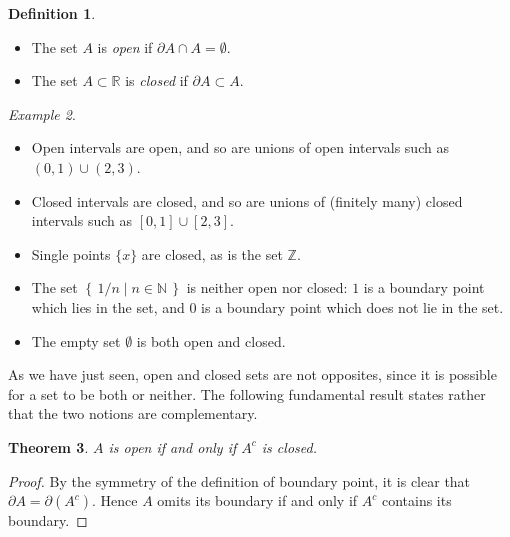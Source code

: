 \documentclass[11pt,oneside]{amsbook}
\newcommand{\set}[1]{\left\{\,#1\,\right\}}
\newcommand{\N}{\mathbb N}
\newcommand{\Z}{\mathbb Z}
\newcommand{\R}{\mathbb R}
\theoremstyle{definition}
\theoremstyle{plain}
\newtheorem{theorem}{Theorem}[section]
\theoremstyle{definition}
\newtheorem{definition}[theorem]{Definition}
\theoremstyle{remark}
\newtheorem{example}[theorem]{Example}
\numberwithin{equation}{section}
\numberwithin{figure}{section}
\begin{document}
\begin{definition}
  \begin{itemize}
    \item The set $A$ is \emph{open} if $\partial A\cap A=\emptyset$.
    \item The set $A\subset\R$ is \emph{closed} if $\partial A\subset A$.
  \end{itemize}
\end{definition}

\begin{example}
  \begin{itemize}
  \item Open intervals are open, and so are unions of open intervals such as $(0,1)\cup(2,3)$.
  \item Closed intervals are closed, and so are unions of (finitely many) closed intervals such as $[0,1]\cup[2,3]$.
  \item Single points $\{x\}$ are closed, as is the set $\Z$.
  \item The set $\set{1/n\mid n\in\N}$ is neither open nor closed: $1$ is a boundary point which lies in the set, and $0$ is a boundary point which does not lie in the set.
  \item The empty set $\emptyset$ is both open and closed.
  \end{itemize}
\end{example}

As we have just seen, open and closed sets are not opposites, since it is possible for a set to be both or neither. The following fundamental result states rather that the two notions are complementary.

\begin{theorem}
  $A$ is open if and only if $A^c$ is closed.
\end{theorem}

\begin{proof}
  By the symmetry of the definition of boundary point, it is clear that $\partial A=\partial(A^c)$. Hence $A$ omits its boundary if and only if $A^c$ contains its boundary.
\end{proof}
\end{document}
